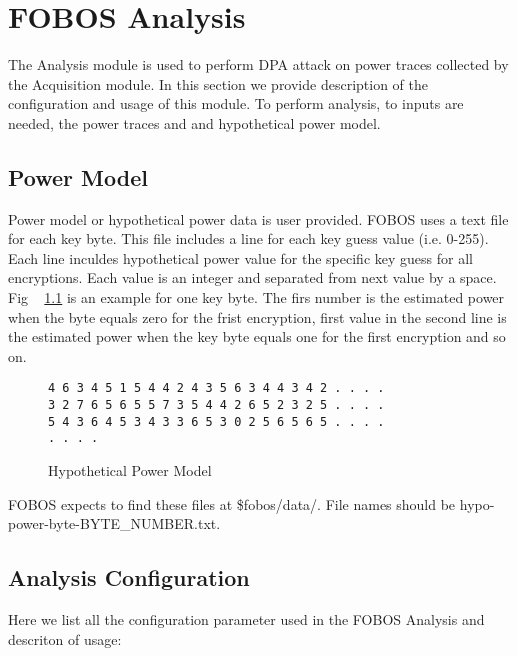 \chapter{FOBOS Analysis} \label{chap:dataAnalysis}
The Analysis module is used to perform DPA attack on power traces collected by the Acquisition module. In this section we provide description of the configuration and
usage of this module. To perform analysis, to inputs are needed, the power traces and and hypothetical power model.
\section{Power Model}
Power model or hypothetical power data is user provided. FOBOS uses a text file for each key byte.
This file includes a line for each key guess value (i.e. 0-255). Each line inculdes hypothetical power value for the specific key guess for all encryptions. Each value is an integer and separated from next value by a space. Fig ~ \ref{fig:fobos-estpower} is an example for one key byte. The firs number is the estimated power when the byte equals zero for the frist encryption, first value in the second line is the estimated power when the key byte equals one for the first encryption and so on.

\begin{figure}[H]
\begin{Verbatim}[frame=single]
4 6 3 4 5 1 5 4 4 2 4 3 5 6 3 4 4 3 4 2 . . . .
3 2 7 6 5 6 5 5 7 3 5 4 4 2 6 5 2 3 2 5 . . . .
5 4 3 6 4 5 3 4 3 3 6 5 3 0 2 5 6 5 6 5 . . . .
. . . .
\end{Verbatim}
\caption{\label{fig:fobos-estpower}Hypothetical Power Model}
\end{figure}

FOBOS expects to find these files at \$fobos/data/. File names should be hypo-power-byte-BYTE\_NUMBER.txt.

\section{Analysis Configuration}
Here we list all the configuration parameter used in the FOBOS Analysis and descriton of usage:

